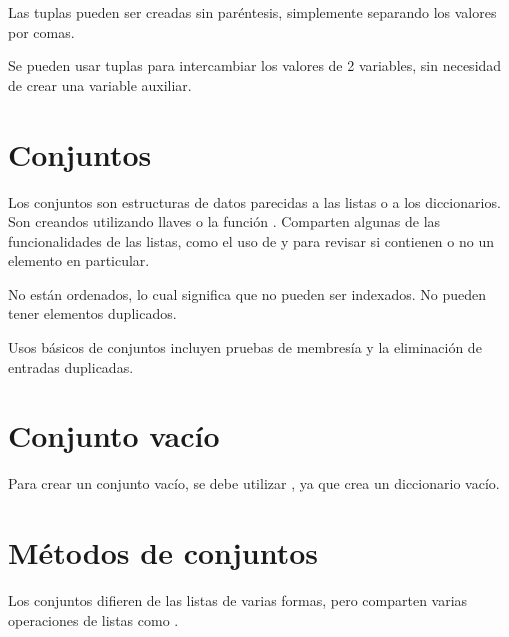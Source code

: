 
Las tuplas pueden ser creadas sin paréntesis, simplemente separando los valores por comas.


Se pueden usar tuplas para intercambiar los valores de 2 variables, sin necesidad de crear una variable auxiliar.


\section{Conjuntos}

Los conjuntos son estructuras de datos parecidas a las listas o a los diccionarios.
Son creandos utilizando llaves \ttt{\{\}}o la función .
Comparten algunas de las funcionalidades de las listas, como el uso de  y  para revisar si contienen o no un elemento en particular.


No están ordenados, lo cual significa que no pueden ser indexados.
No pueden tener elementos duplicados.


Usos básicos de conjuntos incluyen pruebas de membresía y la eliminación de entradas duplicadas.

\section{Conjunto vacío}

Para crear un conjunto vacío, se debe utilizar , ya que \ttt{\{\}} crea un diccionario vacío.


\section{Métodos de conjuntos}

Los conjuntos difieren de las listas de varias formas, pero comparten varias operaciones de listas como .

